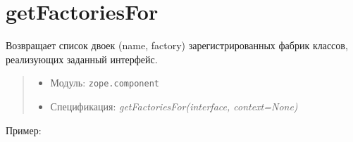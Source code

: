 \documentclass[14pt,a4paper,openany,twoside,final]{extbook}
\providecommand*{\DUroletitlereference}[1]{\textsl{#1}}
\begin{document}
\section*{getFactoriesFor%
  \label{getfactoriesfor}%
}

Возвращает список двоек (name, factory) зарегистрированных фабрик
классов, реализующих заданный интерфейс.

\begin{quote}

\begin{itemize}

\item Модуль: \texttt{zope.component}

\item Спецификация: \DUroletitlereference{getFactoriesFor(interface, context=None)}

\end{itemize}

\end{quote}

Пример:
\end{document}

